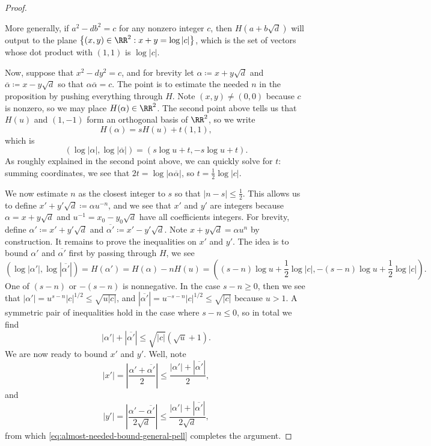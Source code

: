 \documentclass[../notes.tex]{subfiles}
\begin{document}
\begin{proof}
\begin{itemize}
		More generally, if $a^2-db^2=c$ for any nonzero integer $c$, then $H(a+b\sqrt d)$ will output to the plane $\left\{(x,y)\in\RR^2:x+y=\log\left|c\right|\right\}$, which is the set of vectors whose dot product with $(1,1)$ is $\log\left|c\right|$.
	\end{itemize}
	Now, suppose that $x^2-dy^2=c$, and for brevity let $\alpha\coloneqq x+y\sqrt d$ and $\overline\alpha\coloneqq x-y\sqrt d$ so that $\alpha\overline\alpha=c$. The point is to estimate the needed $n$ in the proposition by pushing everything through $H$. Note $(x,y)\ne(0,0)$ because $c$ is nonzero, so we may place $H(\alpha)\in\RR^2$. The second point above tells us that $H(u)$ and $(1,-1)$ form an orthogonal basis of $\RR^2$, so we write
	\[H(\alpha)=sH(u)+t(1,1),\]
	which is
	\[\left(\log\left|\alpha\right|,\log\left|\overline\alpha\right|\right)=(s\log u+t,-s\log u+t).\]
	As roughly explained in the second point above, we can quickly solve for $t$: summing coordinates, we see that $2t=\log\left|\alpha\overline\alpha\right|$, so $t=\frac12\log\left|c\right|$.

	We now estimate $n$ as the closest integer to $s$ so that $\left|n-s\right|\le\frac12$. This allows us to define $x'+y'\sqrt d\coloneqq\alpha u^{-n}$, and we see that $x'$ and $y'$ are integers because $\alpha=x+y\sqrt d$ and $u^{-1}=x_0-y_0\sqrt d$ have all coefficients integers. For brevity, define $\alpha'\coloneqq x'+y'\sqrt d$ and $\overline{\alpha'}\coloneqq x'-y'\sqrt d$. Note $x+y\sqrt d=\alpha u^n$ by construction. It remains to prove the inequalities on $x'$ and $y'$. The idea is to bound $\alpha'$ and $\overline{\alpha'}$ first by passing through $H$, we see
	\[\left(\log\left|\alpha'\right|,\log\left|\overline{\alpha'}\right|\right)=H(\alpha')=H(\alpha)-nH(u)=\left((s-n)\log u+\frac12\log\left|c\right|,-(s-n)\log u+\frac12\log\left|c\right|\right).\]
	One of $(s-n)$ or $-(s-n)$ is nonnegative. In the case $s-n\ge0$, then we see that $\left|\alpha'\right|=u^{s-n}\left|c\right|^{1/2}\le\sqrt{u\left|c\right|}$, and $\left|\overline{\alpha'}\right|=u^{-s-n}\left|c\right|^{1/2}\le\sqrt{\left|c\right|}$ because $u>1$. A symmetric pair of inequalities hold in the case where $s-n\le0$, so in total we find
	\begin{equation}
		\left|\alpha'\right|+\left|\overline{\alpha'}\right|\le\sqrt{\left|c\right|}\left(\sqrt u+1\right). \label{eq:almost-needed-bound-general-pell}
	\end{equation}
	We are now ready to bound $x'$ and $y'$. Well, note
	\[\left|x'\right|=\left|\frac{\alpha'+\overline{\alpha'}}2\right|\le\frac{\left|\alpha'\right|+\left|\overline{\alpha'}\right|}2,\]
	and
	\[\left|y'\right|=\left|\frac{\alpha'-\overline{\alpha'}}{2\sqrt d}\right|\le\frac{\left|\alpha'\right|+\left|\overline{\alpha'}\right|}{2\sqrt d},\]
	from which \eqref{eq:almost-needed-bound-general-pell} completes the argument.
\end{proof}
\end{document}
